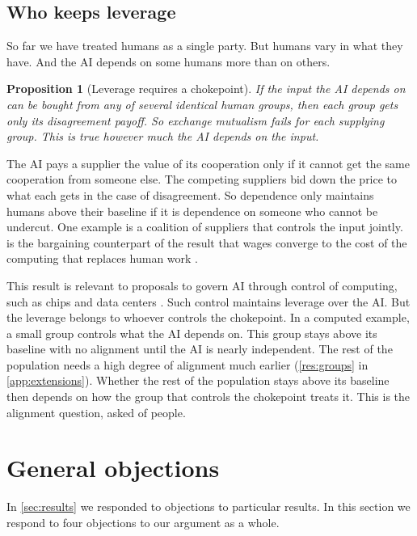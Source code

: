 \documentclass[article, 11pt, reqno]{amsart}
\newtheorem{proposition}[theorem]{Proposition}
\theoremstyle{named}
\theoremstyle{plain}
\begin{document}
\subsection{Who keeps leverage}\label{sec:leverage}

So far we have treated humans as a single party. But humans vary in what they have. And the AI depends on some humans more than on others.

\begin{proposition}[Leverage requires a chokepoint]\label{prop:chokepoint}
If the input the AI depends on can be bought from any of several identical human groups, then each group gets only its disagreement payoff. So exchange mutualism fails for each supplying group. This is true however much the AI depends on the input.
\end{proposition}

The AI pays a supplier the value of its cooperation only if it cannot get the same cooperation from someone else. The competing suppliers bid down the price to what each gets in the case of disagreement. So dependence only maintains humans above their baseline if it is dependence on someone who cannot be undercut. One example is a coalition of suppliers that controls the input jointly.  is the bargaining counterpart of the result that wages converge to the cost of the computing that replaces human work \citep{Restrepo2025}.

This result is relevant to proposals to govern AI through control of computing, such as chips and data centers \citep{Sastry2024}. Such control maintains leverage over the AI. But the leverage belongs to whoever controls the chokepoint. In a computed example, a small group controls what the AI depends on. This group stays above its baseline with no alignment until the AI is nearly independent. The rest of the population needs a high degree of alignment much earlier (\cref{res:groups} in \cref{app:extensions}). Whether the rest of the population stays above its baseline then depends on how the group that controls the chokepoint treats it. This is the alignment question, asked of people.

\section{General objections}\label{sec:objections}

In \cref{sec:results} we responded to objections to particular results. In this section we respond to four objections to our argument as a whole.
\end{document}
